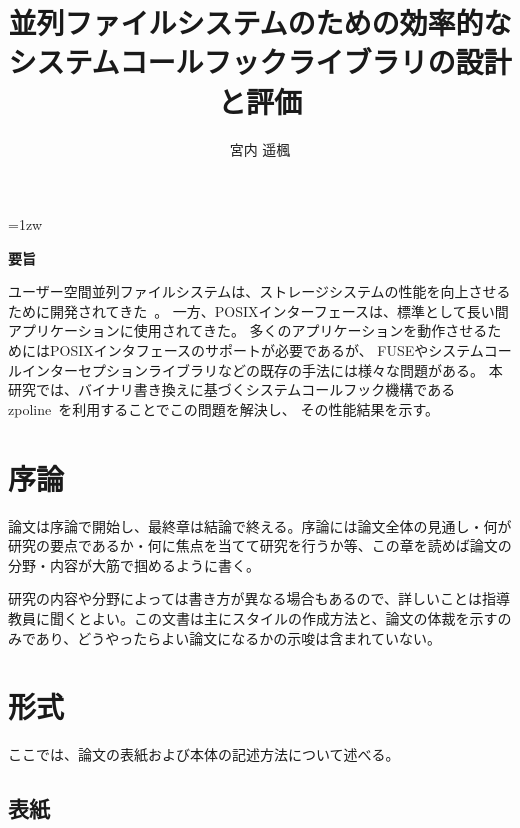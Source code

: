 \documentclass[a4paper,11pt]{jreport}
\title{並列ファイルシステムのための効率的な\\システムコールフックライブラリの設計と評価}
\author{宮内 遥楓}
\begin{document}
\maketitle
\thispagestyle{empty}
\newpage

\thispagestyle{empty}
\vspace*{20pt plus 1fil}
\parindent=1zw
\noindent
\begin{center}
{\Large \bf 要旨}
\vspace{2cm}
\end{center}
ユーザー空間並列ファイルシステムは、ストレージシステムの性能を向上させるために開発されてきた~\cite{tatebe2022chfs, 8514892, 10177390}。 
一方、POSIXインターフェースは、標準として長い間アプリケーションに使用されてきた。 
多くのアプリケーションを動作させるためにはPOSIXインタフェースのサポートが必要であるが、
FUSEやシステムコールインターセプションライブラリなどの既存の手法には様々な問題がある。
本研究では、バイナリ書き換えに基づくシステムコールフック機構であるzpoline~\cite{288689}を利用することでこの問題を解決し、
その性能結果を示す。

\par
\vspace{0pt plus 1fil}
\newpage

\tableofcontents
\listoffigures

\pagebreak \setcounter{page}{1}

\chapter{序論}

論文は序論で開始し、最終章は結論で終える。序論には論文全体の見通し・何が
研究の要点であるか・何に焦点を当てて研究を行うか等、この章を読めば論文の
分野・内容が大筋で掴めるように書く。

研究の内容や分野によっては書き方が異なる場合もあるので、詳しいことは指導
教員に聞くとよい。この文書は主にスタイルの作成方法と、論文の体裁を示すの
みであり、どうやったらよい論文になるかの示唆は含まれていない。

\chapter{形式}

ここでは、論文の表紙および本体の記述方法について述べる。

\section{表紙}
\end{document}
